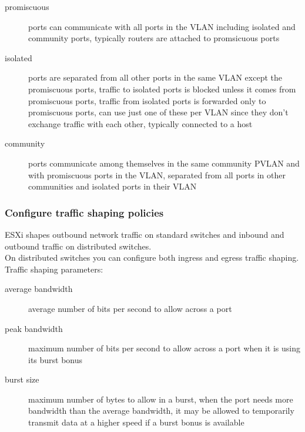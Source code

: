 \begin{description}

\item[promiscuous]
ports can communicate with all ports in the VLAN including isolated and
community ports, typically routers are attached to promsicuous ports

\item[isolated]
ports are separated from all other ports in the same VLAN except the
promiscuous ports, traffic to isolated ports is blocked unless it comes from
promiscuous ports, traffic from isolated ports is forwarded only to
promiscuous ports, can use just one of these per VLAN since they don't
exchange traffic with each other, typically connected to a host

\item[community]
ports communicate among themselves in the same community PVLAN and with
promiscuous ports in the VLAN, separated from all ports in other communities
and isolated ports in their VLAN

\end{description}

\subsubsection{Configure traffic shaping policies}

ESXi shapes outbound network traffic on standard switches and inbound and
outbound traffic on distributed switches.\\

On distributed switches you can configure both ingress and egress traffic
shaping.\\

Traffic shaping parameters:

\begin{description}

\item[average bandwidth]
average number of bits per second to allow across a port

\item[peak bandwidth]
maximum number of bits per second to allow across a port when it is using
its burst bonus

\item[burst size]
maximum number of bytes to allow in a burst, when the port needs more
bandwidth than the average bandwidth, it may be allowed to temporarily
transmit data at a higher speed if a burst bonus is available

\end{description}

